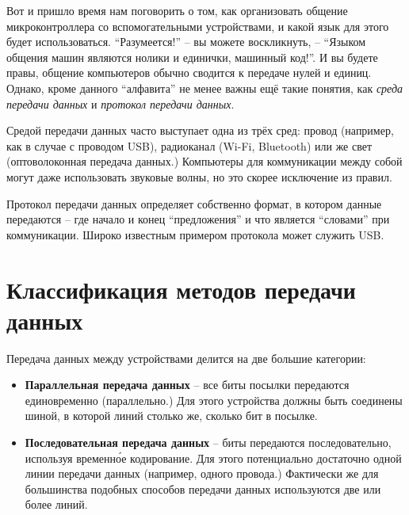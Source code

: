 \documentclass[../sparc.tex]{subfiles}
\begin{document}

Вот и пришло время нам поговорить о том, как организовать общение
микроконтроллера со вспомогательными устройствами, и какой язык для этого будет
использоваться.  ``Разумеется!'' -- вы можете воскликнуть, -- ``Языком общения
машин являются нолики и единички, машинный код!''.  И вы будете правы, общение
компьютеров обычно сводится к передаче нулей и единиц.  Однако, кроме данного
``алфавита'' не менее важны ещё такие понятия, как \emph{среда передачи данных}
и \emph{протокол передачи данных}.

Средой передачи данных часто выступает одна из трёх сред: провод (например, как
в случае с проводом USB), радиоканал (Wi-Fi, Bluetooth) или же свет
(оптоволоконная передача данных.)  Компьютеры для коммуникации между собой могут
даже использовать звуковые волны, но это скорее исключение из правил.

Протокол передачи данных определяет собственно формат, в котором данные
передаются -- где начало и конец ``предложения'' и что является ``словами'' при
коммуникации.  Широко известным примером протокола может служить USB.

\section{Классификация методов передачи данных}


Передача данных между устройствами делится на две большие категории:

\begin{itemize}
\item \textbf{Параллельная передача данных} -- все биты посылки передаются
  единовременно (параллельно.)  Для этого устройства должны быть соединены
  шиной, в которой линий столько же, сколько бит в посылке.
\item \textbf{Последовательная передача данных} -- биты передаются
  последовательно, используя временн\'{о}е кодирование.  Для этого потенциально
  достаточно одной линии передачи данных (например, одного провода.) Фактически
  же для большинства подобных способов передачи данных используются две или
  более линий.
\end{itemize}

\end{document}
